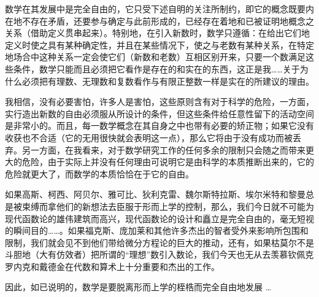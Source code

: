     数学在其发展中是完全自由的，它只受下述自明的关注所制约，即它的概念既要内在地不存在矛盾，还要参与确定与此前形成的，已经存在着地和已被证明地概念之关系（借助定义贯串起来）。特别地，在引入新数时，数学只遵循：在给出它们地定义时使之具有某种确定性，并且在某些情况下，使之与老数有某种关系，在特定地场合中这种关系一定会使它们（新数和老数）互相区别开来，只要一个数满足这些条件，数学只能而且必须把它看作是存在的和实在的东西，这正是我……关于为什么必须把有理数、无理数和复数看作与有限正整数一样是实在的所建议的理由。
    
    我相信，没有必要害怕，许多人是害怕，这些原则含有对于科学的危险，一方面，实行造出新数的自由必须服从所设计的条件，但这些条件给任意性留下的活动空间是非常小的。而且，每一数学概念在其自身之中也带有必要的矫正物；如果它没有收获也不合适（它的无用很快就会表明这一点），那么它将由于没有成功而被丢弃。另一方面，在我看来，对于数学研究工作的任何多余的限制只会随之而带来更大的危险，由于实际上并没有任何理由可说明它是由科学的本质推断出来的，它的危险就更大了，而数学的本质恰恰在于它的自由。
    
    如果高斯、柯西、阿贝尔、雅可比、狄利克雷、魏尔斯特拉斯、埃尔米特和黎曼总是被束缚而拿他们的新想法去臣服于形而上学的控制，那么，我们今日就不可能为现代函数论的雄伟建筑而高兴，现代函数论的设计和矗立是完全自由的，毫无短视的瞬间目的……。如果福克斯、庞加莱和其他许多杰出的智者受外来影响所包围和限制，我们就会见不到他们带给微分方程论的巨大的推动，还有，如果枯莫尔不是斗胆地（大有仿效者）把所谓的“理想”数引入数论，我们今天也无从去羡慕钦佩克罗内克和戴德金在代数和算术上十分重要和杰出的工作。
    
    因此，如已说明的，数学是要脱离形而上学的桎梏而完全自由地发展 \dots
    
    
    
    